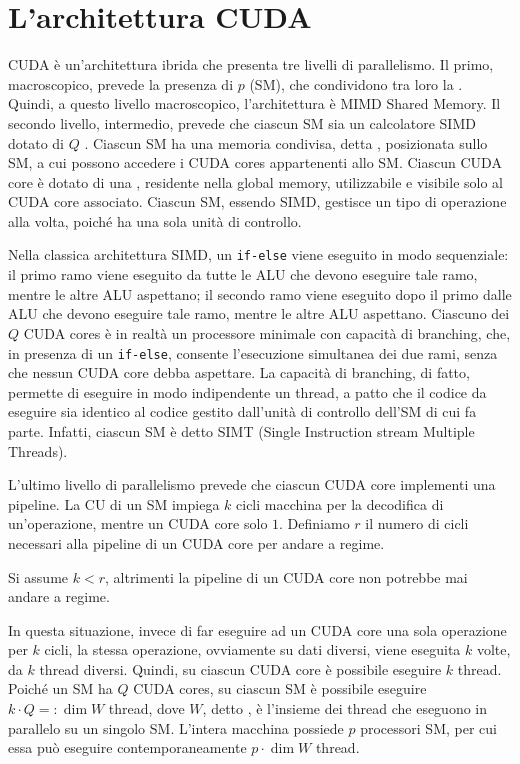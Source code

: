 \section{L'architettura CUDA}
CUDA è un'architettura ibrida che presenta tre livelli di parallelismo. Il primo, macroscopico, prevede la presenza di $p$  (SM), che condividono tra loro la . Quindi, a questo livello macroscopico, l'architettura è MIMD Shared Memory. Il secondo livello, intermedio, prevede che ciascun SM sia un calcolatore SIMD dotato di $Q$ . Ciascun SM ha una memoria condivisa, detta , posizionata sullo SM, a cui possono accedere i CUDA cores appartenenti allo SM. 
Ciascun CUDA core è dotato di una , residente nella global memory, utilizzabile e visibile solo al CUDA core associato. 
Ciascun SM, essendo SIMD, gestisce un tipo di operazione alla volta, poiché ha una sola unità di controllo.

\begin{observation}{}
Nella classica architettura SIMD, un \texttt{if-else} viene eseguito in modo sequenziale: il primo ramo viene eseguito da tutte le ALU che devono eseguire tale ramo, mentre le altre ALU aspettano; il secondo ramo viene eseguito dopo il primo dalle ALU che devono eseguire tale ramo, mentre le altre ALU aspettano. 
Ciascuno dei $Q$ CUDA cores è in realtà un processore minimale con capacità di branching, che, in presenza di un \texttt{if-else}, consente l'esecuzione simultanea dei due rami, senza che nessun CUDA core debba aspettare.
La capacità di branching, di fatto, permette di eseguire in modo indipendente un thread, a patto che il codice da eseguire sia identico al codice gestito dall'unità di controllo dell'SM di cui fa parte.
Infatti, ciascun SM è detto SIMT (Single Instruction stream Multiple Threads).
\end{observation}

L'ultimo livello di parallelismo prevede che ciascun CUDA core implementi una pipeline. La CU di un SM impiega $k$ cicli macchina per la decodifica di un'operazione, mentre un CUDA core solo $1$. Definiamo $r$ il numero di cicli necessari alla pipeline di un CUDA core per andare a regime.

\begin{note}{}
Si assume $k<r$, altrimenti la pipeline di un CUDA core non potrebbe mai andare a regime.
\end{note}

In questa situazione, invece di far eseguire ad un CUDA core una sola operazione per $k$ cicli, la stessa operazione, ovviamente su dati diversi, viene eseguita $k$ volte, da $k$ thread diversi. Quindi, su ciascun CUDA core è possibile eseguire $k$ thread. Poiché un SM ha $Q$ CUDA cores, su ciascun SM è possibile eseguire $k\cdot Q=:\dim W$ thread, dove $W$, detto , è l'insieme dei thread che eseguono in parallelo su un singolo SM. L'intera macchina possiede $p$ processori SM, per cui essa può eseguire contemporaneamente $p\cdot \dim W$ thread.

